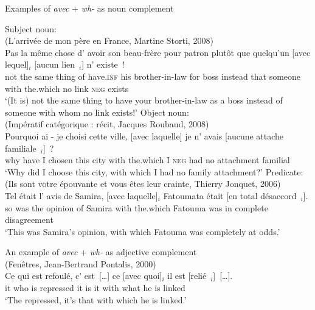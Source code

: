 \begin{exe}
    \ex Examples of \emph{avec} + \emph{wh-} as noun complement\label{ex:avecq-noun}
    \begin{xlist}
        \ex Subject noun:\nopagebreak \\ 
(L'arrivée de mon père en France, Martine Storti, 2008)\\
\gll Pas la même chose d' avoir son beau-frère pour patron plutôt que quelqu'un	[avec lequel]$_i$ [aucun lien~\trace{}$_i$] n' existe~!\\
not the same thing of have\textsc{.inf} his brother-in-law for boss instead that someone with the.which no link \textsc{neg} exists\\
\glt `(It is) not the same thing to have your brother-in-law as a boss instead of someone with whom no link exists!'
\label{ex:avecq-subj}
\ex Object noun:\nopagebreak \\ 
(Impératif catégorique : récit, Jacques Roubaud, 2008)\\
\gll Pourquoi ai - je choisi cette ville, [avec laquelle] je n' avais [aucune attache familiale~\trace{}$_i$]~?\\
why have {} I chosen this city with the.which I \textsc{neg} had no attachment familial\\
\glt `Why did I choose this city, with which I had no family attachment?'
\ex Predicate:\nopagebreak \\ 
(Ils sont votre épouvante et vous êtes leur crainte, Thierry Jonquet, 2006)\\
\gll Tel était l' avis de Samira, [avec laquelle]$_i$ Fatoumata était [en total désaccord~\trace{}$_i$].\\
so was the opinion of Samira with the.which Fatouma was in complete disagreement\\
\glt `This was Samira's opinion, with which Fatouma was completely at odds.'
\label{ex:avecq-pred}
    \end{xlist}
\end{exe}

\ea An example of \emph{avec} + \emph{wh-} as adjective complement\nopagebreak\\
(Fenêtres, Jean-Bertrand Pontalis, 2000)\\
\gll Ce qui est refoulé, c' est~[\dots] ce [avec quoi]$_i$ il est [relié~\trace{}$_i$]~[\dots].\\
it who is repressed it is it with what he is linked\\
\glt `The repressed, it's that with which he is linked.'
\label{ex:avecq-adjective}
\z 


